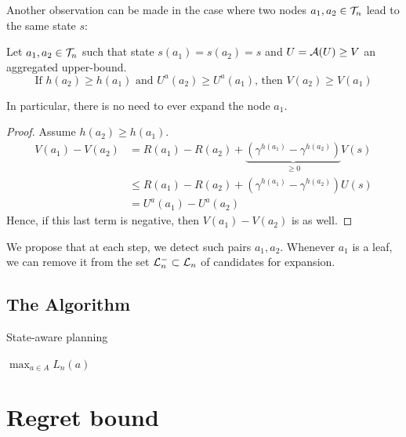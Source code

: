 \documentclass{article}
\begin{document}
Another observation can be made in the case where two nodes $a_1,a_2\in\mathcal{T}_n$ lead to the same state $s$:
\begin{proposition}
\label{prop:pruning}
Let $a_1,a_2\in\mathcal{T}_n$ such that state $s(a_1) = s(a_2) = s$ and $U = \mathcal{A}(U) \geq V$ an aggregated upper-bound. 
\begin{equation}
\label{eq:pruning}
    \text{If } h(a_2) \geq h(a_1) \text{ and } U^a(a_2) \geq U^a(a_1)
    \text{, then }V(a_2) \geq V(a_1)
\end{equation}

In particular, there is no need to ever expand the node $a_1$.
\end{proposition}
\begin{proof}
Assume $h(a_2) \geq h(a_1)$.
\begin{align*}
    V(a_1) - V(a_2) &= R(a_1)- R(a_2) + \underbrace{\left(\gamma^{h(a_1)} - \gamma^{h(a_2)}\right)}_{\geq 0}V(s) \\
    &\leq R(a_1)- R(a_2) + \left(\gamma^{h(a_1)} - \gamma^{h(a_2)}\right)U(s)\\
    &= U^a(a_1) - U^a(a_2)
\end{align*}
Hence, if this last term is negative, then $V(a_1) - V(a_2)$ is as well.
\end{proof}

We propose that at each step, we detect such pairs $a_1, a_2$. Whenever $a_1$ is a leaf, we can remove it from the set $\mathcal{L}_n^-\subset \mathcal{L}_n $ of candidates for expansion.

\subsection{The Algorithm}

\begin{algorithm}[htp]
	\caption{State-aware planning}
	\label{alg:state-aware}
	\SetAlgoLined\DontPrintSemicolon
	\Return $\max_{a\in A} L_n(a)$\;
\end{algorithm}

\section{Regret bound}
\end{document}

